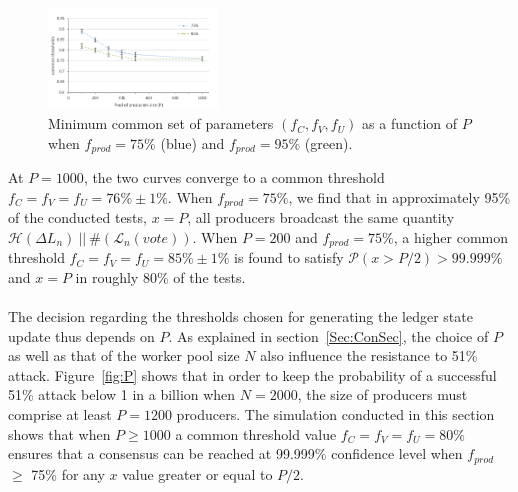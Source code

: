 \begin{figure}
 \vspace{-1.5cm}
 \begin{center}
   \includegraphics[width=0.4\textwidth]{Figures/tree_summary_p200t1000.png}
 \end{center}
 \vspace{-0.6cm}
  \caption{Minimum common set of parameters $(f_C, f_V, f_U)$ as a function of $P$ when $f_{prod} = 75\%$ (blue) and $f_{prod} = 95\%$ (green).}
   \label{fig:treeSum}
\end{figure}

At $P=1000$, the two curves converge to a common threshold $f_C=f_V=f_U=76\% \pm 1\%$. When $f_{prod} = 75\%$, we find that in approximately 95\% of the conducted tests, $x=P$, all producers broadcast the same quantity $\mathcal{H}(\Delta L_n)~||~\#(\mathcal{L}_{n}(vote))$. When $P=200$ and $f_{prod} = 75\%$, a higher common threshold $f_C = f_V = f_U = 85\% \pm 1\%$ is found to satisfy $\mathcal{P}(x>P/2) > 99.999\%$ and $x=P$ in roughly 80\% of the tests.\\
\\
The decision regarding the thresholds chosen for generating the ledger state update thus depends on $P$. As explained in section~\ref{Sec:ConSec}, the choice of $P$ as well as that of the worker pool size $N$ also influence the resistance to 51\% attack. Figure~\ref{fig:P} shows that in order to keep the probability of a successful 51\% attack below 1 in a billion when $N=2000$, the size of producers must comprise at least $P=1200$ producers. The simulation conducted in this section shows that when $P \geq 1000$ a common threshold value $f_C = f_V = f_U = 80\%$ ensures that a consensus can be reached at 99.999\% confidence level when $f_{prod}$ $\geq$ 75\% for any $x$ value greater or equal to $P/2$.


